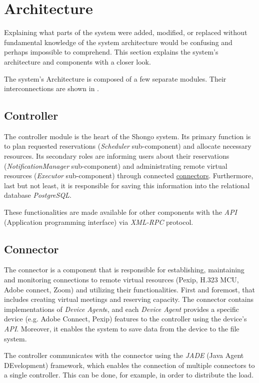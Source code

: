 \section{Architecture}
Explaining what parts of the system were added, modified, or replaced without fundamental knowledge of the system architecture would be confusing and perhaps impossible to comprehend. This section explains the system’s architecture and components with a closer look.

The system's Architecture is composed of a few separate modules. Their interconnections are shown in .

\subsection{Controller} \label{controller}
The controller module is the heart of the Shongo system.
Its primary function is to plan requested reservations (\emph{Scheduler} sub-component) and allocate necessary resources.
Its secondary roles are informing users about their reservations (\emph{NotificationManager} sub-component) and administrating remote virtual resources (\emph{Executor} sub-component) through connected \hyperref[connector]{connectors}.
Furthermore, last but not least, it is responsible for saving this information into the relational database \emph{PostgreSQL}.

These functionalities are made available for other components with the \emph{API} (Application programming interface) via \emph{XML-RPC} protocol.

\subsection{Connector} \label{connector}
The connector is a component that is responsible for establishing, maintaining and monitoring connections to remote virtual resources (Pexip, H.323 MCU, Adobe connect, Zoom) and utilizing their functionalities. First and foremost, that includes creating virtual meetings and reserving capacity.
The connector contains implementations of \emph{Device Agent}s, and each \emph{Device Agent} provides a specific device (e.g. Adobe Connect, Pexip) features to the controller using the device’s \emph{API}.
Moreover, it enables the system to save data from the device to the file system.

The controller communicates with the connector using the \emph{JADE} (Java Agent DEvelopment) framework, which enables the connection of multiple connectors to a single controller. This can be done, for example, in order to distribute the load.

